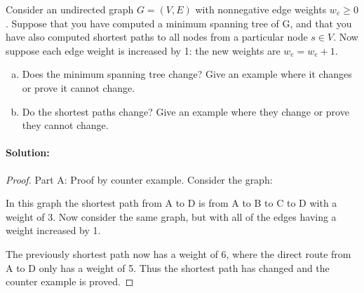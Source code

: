 \documentclass[12pt]{article}
\begin{document}
Consider an undirected graph $G = (V, E)$ with nonnegative edge weights
$ w_e \ge 0$. Suppose that you have computed a minimum spanning tree of
G, and that you have also computed shortest paths to all nodes from a
particular node $s \in V$.  Now suppose each edge weight is increased by
1: the new weights are $w_e = w_e + 1$.

\begin{enumerate}[(a)]
\item Does the minimum spanning tree change? Give an example where it
      changes or prove it cannot change.
\item Do the shortest paths change? Give an example where they change or
      prove they cannot change.
\end{enumerate}

\paragraph{Solution:}
\begin{proof}
Part A:  Proof by counter example.
Consider the graph:

\begin{center}
\end{center}

In this graph the shortest path from A to D is from A to B to C to D
with a weight of 3. Now consider the same graph, but with all of the
edges having a weight increased by 1.

\begin{center}
\end{center}

The previously shortest path now has a weight of 6, where the direct
route from A to D only has a weight of 5.  Thus the shortest path has
changed and the counter example is proved.
\end{proof}
\end{document}

